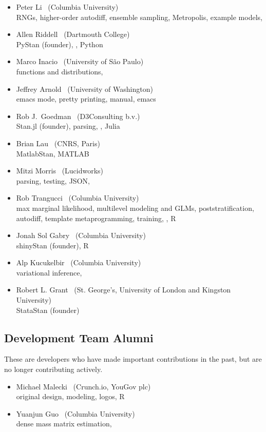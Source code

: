 \begin{itemize}
\\ {\footnotesize RStan (founder), modeling, \Cpp, Rcpp, R}
\item Peter Li \   (Columbia University)
\\ {\footnotesize RNGs, higher-order autodiff, ensemble sampling,
  Metropolis, example models, \Cpp}
\item Allen Riddell \   (Dartmouth College)
\\ {\footnotesize PyStan (founder), \Cpp, Python}
\item Marco Inacio \   (University of S\~{a}o Paulo)
\\ {\footnotesize functions and distributions, \Cpp}
\item Jeffrey Arnold \   (University of Washington)
\\ {\footnotesize emacs mode, pretty printing, manual, emacs}
\item Rob J.\ Goedman \ (D3Consulting b.v.)
\\ {\footnotesize Stan.jl (founder), parsing, \Cpp, Julia}
\item Brian Lau \ (CNRS, Paris)
\\ {\footnotesize MatlabStan, MATLAB}
\item Mitzi Morris \   (Lucidworks)
\\ {\footnotesize parsing, testing, JSON, \Cpp}
\item Rob Trangucci \   (Columbia University)
\\ {\footnotesize max marginal likelihood, multilevel modeling and
  GLMs, poststratification, autodiff, template metaprogramming, 
  training, \Cpp, R}
\item Jonah Sol Gabry \ (Columbia University)
\\ {\footnotesize shinyStan (founder), R}
\item Alp Kucukelbir \ (Columbia University)
\\ {\footnotesize variational inference, \Cpp}
\item Robert L. Grant \ (St. George's, University of London and
  Kingston University)
\\ {\footnotesize StataStan (founder)}
\end{itemize}

\subsection*{Development Team Alumni}

These are developers who have made important contributions in the
past, but are no longer contributing actively.

\begin{itemize}
\item Michael Malecki \ (Crunch.io, YouGov plc)
\\ {\footnotesize original design, modeling, logos, R}
\item Yuanjun Guo \ (Columbia University)
\\ {\footnotesize dense mass matrix estimation, \Cpp}
\end{itemize}

